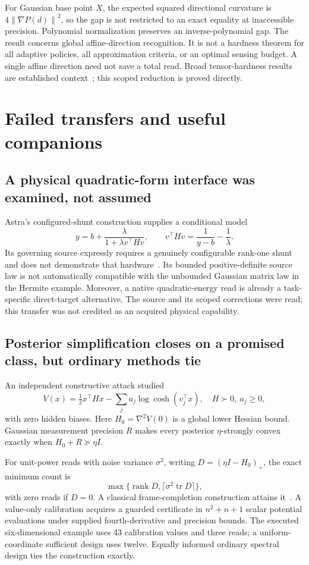 \documentclass[11pt]{article}
\newcommand{\tr}{\operatorname{tr}}
\newcommand{\rank}{\operatorname{rank}}
\newcommand{\norm}[1]{\left\lVert#1\right\rVert}
\begin{document}
For Gaussian base point $X$, the expected squared directional curvature is $4\norm{\nabla P(d)}^2$, so the gap is not restricted to an exact equality at inaccessible precision. Polynomial normalization preserves an inverse-polynomial gap. The result concerns global affine-direction recognition. It is not a hardness theorem for all adaptive policies, all approximation criteria, or an optimal sensing budget. A single affine direction need not save a total read. Broad tensor-hardness results are established context~\cite{hillar}; this scoped reduction is proved directly.

\section{Failed transfers and useful companions}

\subsection{A physical quadratic-form interface was examined, not assumed}

Astra's configured-shunt construction supplies a conditional model
\[
y=b+\frac{\lambda}{1+\lambda v^\top H v},\qquad
v^\top Hv=\frac1{y-b}-\frac1\lambda.
\]
Its governing source expressly requires a genuinely configurable rank-one shunt and does not demonstrate that hardware~\cite{astra-shunt}. Its bounded positive-definite source law is not automatically compatible with the unbounded Gaussian matrix law in the Hermite example. Moreover, a native quadratic-energy read is already a task-specific direct-target alternative. The source and its scoped corrections were read; this transfer was not credited as an acquired physical capability.

\subsection{Posterior simplification closes on a promised class, but ordinary methods tie}

An independent constructive attack studied
\[
V(x)=\tfrac12x^\top Hx-\sum_j a_j\log\cosh(v_j^\top x),
\quad H\succ0,\ a_j\ge0,
\]
with zero hidden biases. Here $H_0=\nabla^2V(0)$ is a global lower Hessian bound. Gaussian measurement precision $R$ makes every posterior $\eta$-strongly convex exactly when $H_0+R\succeq\eta I$.

For unit-power reads with noise variance $\sigma^2$, writing $D=(\eta I-H_0)_+$, the exact minimum count is
\[
\max\{\rank D,\lceil\sigma^2\tr D\rceil\},
\]
with zero reads if $D=0$. A classical frame-completion construction attains it~\cite{fickus}. A value-only calibration acquires a guarded certificate in $n^2+n+1$ scalar potential evaluations under supplied fourth-derivative and precision bounds. The executed six-dimensional example uses 43 calibration values and three reads; a uniform-coordinate sufficient design uses twelve. Equally informed ordinary spectral design ties the construction exactly.
\end{document}
